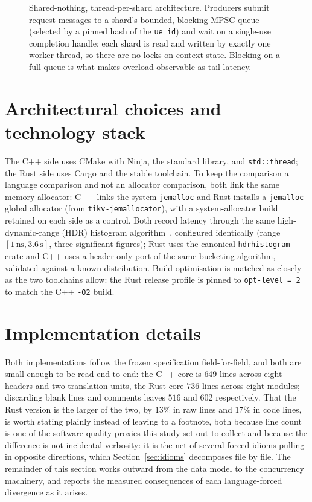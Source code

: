 \documentclass[english,twoside,openright,a4paper,censored,csm,software-track-2020]{HYthesisML}
\begin{document}
\begin{figure}
\caption[Shared-nothing, thread-per-shard architecture]{Shared-nothing, thread-per-shard architecture. Producers submit request messages to a
shard's bounded, blocking MPSC queue (selected by a pinned hash of the \texttt{ue\_id}) and wait
on a single-use completion handle; each shard is read and written by exactly one worker thread,
so there are no locks on context state. Blocking on a full queue is what makes overload
observable as tail latency.\label{fig:arch}}
\end{figure}

\section{Architectural choices and technology stack}
The C++ side uses CMake with Ninja, the standard library, and \texttt{std::thread}; the Rust
side uses Cargo and the stable toolchain. To keep the comparison a language comparison
and not an allocator comparison, both link the same memory allocator: C++ links the
system \texttt{jemalloc} and Rust installs a \texttt{jemalloc} global allocator (from
\texttt{tikv-jemallocator}), with a system-allocator build retained on each side as a
control. Both record latency through the same high-dynamic-range (HDR) histogram
algorithm~\cite{tene_hdrhistogram}, configured identically (range $[1\,\text{ns},
3.6\,\text{s}]$, three significant figures); Rust uses the canonical \texttt{hdrhistogram}
crate and C++ uses a header-only port of the same bucketing algorithm, validated against a
known distribution. Build optimisation is matched as closely as the two toolchains allow:
the Rust release profile is pinned to \texttt{opt-level~=~2} to match the C++ \texttt{-O2}
build.

\section{Implementation details}\label{sec:impldetails}
\label{sec:impl}
Both implementations follow the frozen specification field-for-field, and both are small
enough to be read end to end: the C++ core is $649$ lines across eight headers and two
translation units, the Rust core $736$ lines across eight modules; discarding blank lines and
comments leaves $516$ and $602$ respectively. That the Rust version is the larger of the two,
by $13\%$ in raw lines and $17\%$ in code lines, is worth stating plainly instead of leaving
to a footnote, both because line count is one of the software-quality proxies this study set
out to collect and because the difference is not incidental verbosity: it is the net of
several forced idioms pulling in opposite directions, which Section~\ref{sec:idioms}
decomposes file by file. The remainder of this section works outward from the data model to
the concurrency machinery, and reports the measured consequences of each language-forced
divergence as it arises.
\end{document}

